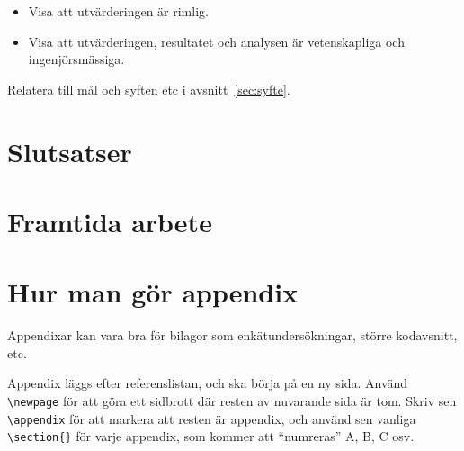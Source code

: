 \documentclass[swedish, a4paper,12pt]{article}
\begin{document}
\begin{itemize}
\item Visa att utvärderingen är rimlig.
\item Visa att utvärderingen, resultatet och analysen är vetenskapliga och ingenjörsmässiga.
\end{itemize}

Relatera till mål och syften etc i avsnitt~\ref{sec:syfte}.
\fi


\section{Slutsatser}

\section{Framtida arbete}

\newpage

%



\newpage
\appendix %
\iffalse \section{Hur man gör appendix}
Appendixar kan vara bra för bilagor som enkätundersökningar, större kodavsnitt, etc.

Appendix läggs efter referenslistan, och ska börja på en ny sida. Använd \verb|\newpage| för att göra ett sidbrott där resten av nuvarande sida är tom. Skriv sen \verb|\appendix| för att markera att resten är appendix, och
 använd sen vanliga \verb|\section{}| för varje appendix, som kommer att ``numreras'' A, B, C osv.
\end{document}
